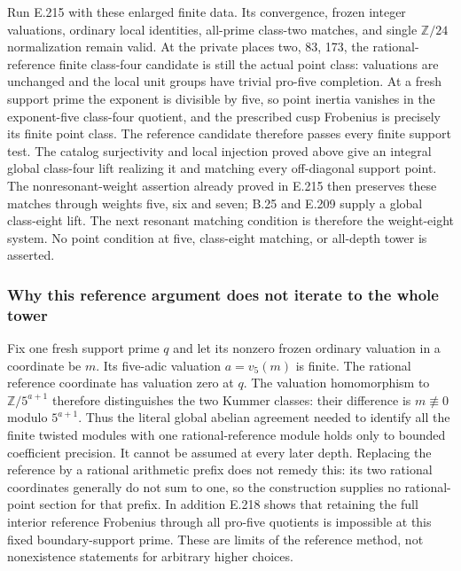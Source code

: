 Run E.215 with these enlarged finite data. Its convergence, frozen
integer valuations, ordinary local identities, all-prime class-two
matches, and single $\mathbb Z/24$ normalization remain valid. At the
private places two, 83, 173, the rational-reference finite class-four
candidate is still the actual point class: valuations are unchanged
and the local unit groups have trivial pro-five completion. At a fresh
support prime the exponent is divisible by five, so point inertia
vanishes in the exponent-five class-four quotient, and the prescribed
cusp Frobenius is precisely its finite point class. The reference
candidate therefore passes every finite support test. The catalog
surjectivity and local injection proved above give an integral global
class-four lift realizing it and matching every off-diagonal support
point. The nonresonant-weight assertion already proved in E.215 then
preserves these matches through weights five, six and seven; B.25 and
E.209 supply a global class-eight lift. The next resonant matching
condition is therefore the weight-eight system. No point condition at
five, class-eight matching, or all-depth tower is asserted.

\subsubsection*{Why this reference argument does not iterate to the whole tower}
Fix one fresh support prime $q$ and let its nonzero frozen ordinary
valuation in a coordinate be $m$. Its five-adic valuation $a=v_5(m)$
is finite. The rational reference coordinate has valuation zero at $q$.
The valuation homomorphism to $\mathbb Z/5^{a+1}$ therefore distinguishes
the two Kummer classes: their difference is $m\not\equiv0$ modulo
$5^{a+1}$. Thus the literal global abelian agreement needed to identify
all the finite twisted modules with one rational-reference module holds
only to bounded coefficient precision. It cannot be assumed at every
later depth. Replacing the reference by a rational arithmetic prefix
does not remedy this: its two rational coordinates generally do not
sum to one, so the construction supplies no rational-point section for
that prefix. In addition E.218 shows that retaining the full interior
reference Frobenius through all pro-five quotients is impossible at
this fixed boundary-support prime. These are limits of the reference
method, not nonexistence statements for arbitrary higher choices.
